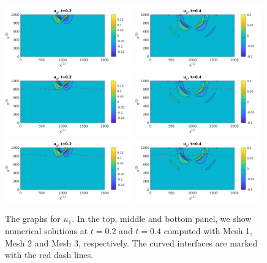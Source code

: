\begin{figure}[htbp]
	\centering
	\includegraphics[width=0.49\textwidth,trim={0.05cm 0.1cm 0.55cm 0.45cm}, clip]{u1_t02_cartesian.png}
	\includegraphics[width=0.49\textwidth,trim={0.05cm 0.1cm 0.55cm 0.45cm}, clip]{u1_t04_cartesian.png}\\
	\includegraphics[width=0.49\textwidth,trim={0.05cm 0.1cm 0.55cm 0.45cm}, clip]{u1_t02_curvi.png}
	\includegraphics[width=0.49\textwidth,trim={0.05cm 0.1cm 0.55cm 0.45cm}, clip]{u1_t04_curvi.png}\\
	\includegraphics[width=0.49\textwidth,trim={0.05cm 0.1cm 0.55cm 0.45cm}, clip]{u1_t02_curvi_finer.png}
	\includegraphics[width=0.49\textwidth,trim={0.05cm 0.1cm 0.55cm 0.45cm}, clip]{u1_t04_curvi_finer.png}
\caption{The graphs for $u_1$. In the top, middle and bottom panel, we show numerical solutions at $t=0.2$ and $t=0.4$ computed with Mesh 1, Mesh 2 and Mesh 3, respectively. The curved interfaces are marked with the red dash lines.}
\label{u1}
\end{figure}

